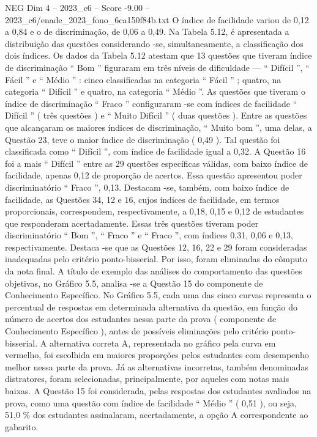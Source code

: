 \begin{textsample}{NEG Dim 4 – 2023\_c6 – Score -9.00 – 2023\_c6/enade\_2023\_fono\_6ca150f84b.txt}
O índice de facilidade variou de 0,12 a 0,84 e o de discriminação, de 0,06 a 0,49.
Na Tabela 5.12, é apresentada a distribuição das questões considerando -se, simultaneamente, a classificação dos dois índices.
Os dados da Tabela 5.12 atestam que 13 questões que tiveram índice de discriminação “ Bom ” figuraram em três níveis de dificuldade — “ Difícil ”, “ Fácil ” e “ Médio ” : cinco classificadas na categoria “ Fácil ” ; quatro, na categoria “ Difícil ” e quatro, na categoria “ Médio ”.
As questões que tiveram o índice de discriminação “ Fraco ” configuraram -se com índices de facilidade “ Difícil ” ( três questões ) e “ Muito Difícil ” ( duas questões ).
Entre as questões que alcançaram os maiores índices de discriminação, “ Muito bom ”, uma delas, a Questão 23, teve o maior índice de discriminação ( 0,49 ).
Tal questão foi classificada como “ Difícil ”, com índice de facilidade igual a 0,32.
A Questão 16 foi a mais “ Difícil ” entre as 29 questões específicas válidas, com baixo índice de facilidade, apenas 0,12 de proporção de acertos.
Essa questão apresentou poder discriminatório “ Fraco ”, 0,13.
Destacam -se, também, com baixo índice de facilidade, as Questões 34, 12 e 16, cujos índices de facilidade, em termos proporcionais, correspondem, respectivamente, a 0,18, 0,15 e 0,12 de estudantes que responderam acertadamente.
Essas três questões tiveram poder discriminatório “ Bom ”, “ Fraco ” e “ Fraco ”, com índices 0,31, 0,06 e 0,13, respectivamente.
Destaca -se que as Questões 12, 16, 22 e 29 foram consideradas inadequadas pelo critério ponto-bisserial.
Por isso, foram eliminadas do cômputo da nota final.
A título de exemplo das análises do comportamento das questões objetivas, no Gráfico 5.5, analisa -se a Questão 15 do componente de Conhecimento Específico.
No Gráfico 5.5, cada uma das cinco curvas representa o percentual de respostas em determinada alternativa da questão, em função do número de acertos dos estudantes nessa parte da prova ( componente de Conhecimento Específico ), antes de possíveis eliminações pelo critério ponto-bisserial.
A alternativa correta A, representada no gráfico pela curva em vermelho, foi escolhida em maiores proporções pelos estudantes com desempenho melhor nessa parte da prova.
Já as alternativas incorretas, também denominadas distratores, foram selecionadas, principalmente, por aqueles com notas mais baixas.
A Questão 15 foi considerada, pelas respostas dos estudantes avaliados na prova, como uma questão com índice de facilidade “ Médio ” ( 0,51 ), ou seja, 51,0 \% dos estudantes assinalaram, acertadamente, a opção A correspondente ao gabarito.

\end{textsample}

